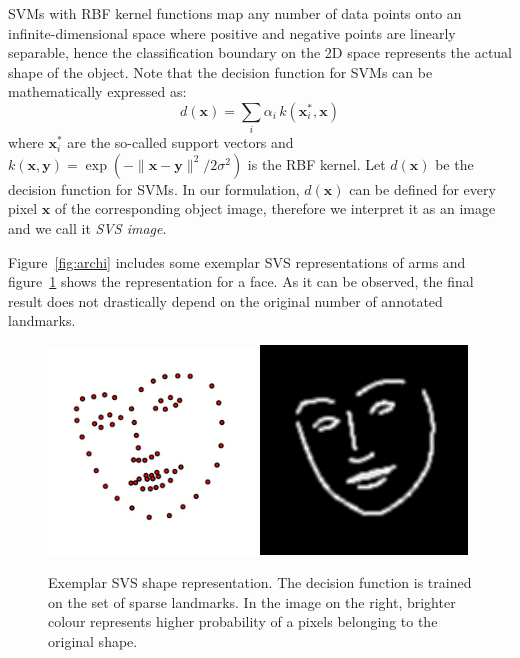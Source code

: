 SVMs with RBF kernel functions map any number of data points onto an infinite-dimensional space where positive and negative points are linearly separable, hence the classification boundary on the 2D space represents the actual shape of the object. Note that the decision function for SVMs can be mathematically expressed as:
\begin{equation} \label{eq:decisionfunc}
   d(\bm{x})=\sum_i\alpha_i \, k(\bm{x}_i^*,\bm{x})
\end{equation}
where $\bm{x}_i^*$ are the so-called support vectors and \mbox{$k(\bm{x}, \bm{y}) = \exp(-{\|\bm{x} -\bm{y}\|^2}/{2 \sigma^2})$} is the RBF kernel.
Let $d(\bm{x})$ be the decision function for SVMs. In our formulation, $d(\bm{x})$ can be defined for every pixel $\bm{x}$ of the corresponding object image, therefore we interpret it as an image and we call it \emph{SVS image}.

Figure~\ref{fig:archi} includes some exemplar SVS representations of arms and figure~\ref{fig:build_svs} shows the representation for a face. As it can be observed, the final result does not drastically depend on the original number of annotated landmarks.

\begin{figure}
    \centering
    \includegraphics[width=0.49\textwidth]{resources/Annotation_Correction/landmark}
    \hfill
    \includegraphics[width=0.49\textwidth]{resources/Annotation_Correction/svs}
    \caption{Exemplar SVS shape representation. The decision function is trained on the set of sparse landmarks. In the image on the right, brighter colour represents higher probability of a pixels belonging to the original shape.}
    \label{fig:build_svs}
\end{figure}

